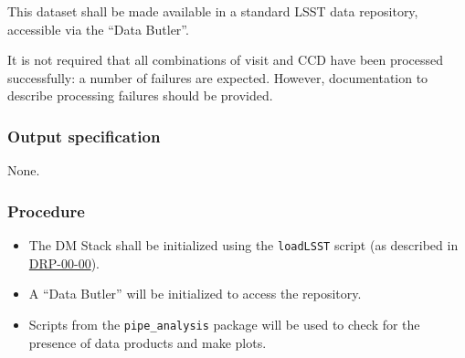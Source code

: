 This dataset shall be made available in a standard LSST data repository,
accessible via the ``Data Butler''.

It is not required that all combinations of visit and CCD have been processed
successfully: a number of failures are expected. However, documentation to
describe processing failures should be provided.

\subsubsection{Output specification}

None.

\subsubsection{Procedure}

\begin{itemize}

  \item{The DM Stack shall be initialized using the \texttt{loadLSST} script
  (as described in \hyperref[drp-00-00]{DRP-00-00}).}

  \item{A ``Data Butler'' will be initialized to access the repository.}

  \item{Scripts from the \texttt{pipe\_analysis} package will be used to check for the presence of data products and make plots.}

\end{itemize}
